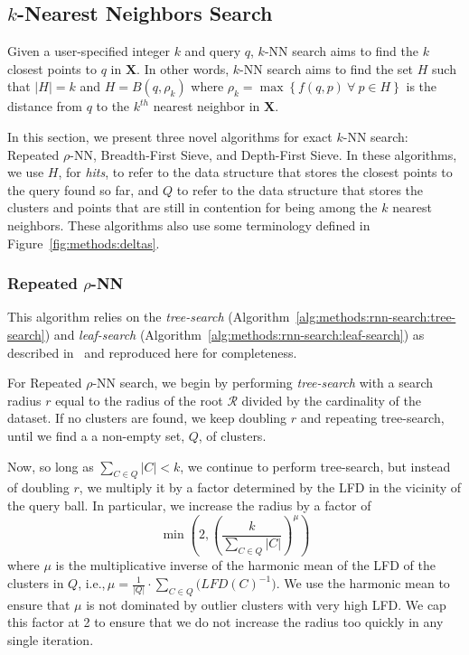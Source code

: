\subsection{\texorpdfstring{$k$}{k}-Nearest Neighbors Search}
\label{sec:methods:knn-search}

Given a user-specified integer $k$ and query $q$, $k$-NN search aims to find the $k$ closest points to $q$ in $\textbf{X}$.
In other words, $k$-NN search aims to find the set $H$ such that $|H| = k$ and $H = B(q, \rho_k)$ where $\rho_k = \max \left\{ f(q, p) \ \forall \ p \in H \right\}$ is the distance from $q$ to the $k^{th}$ nearest neighbor in $\textbf{X}$.

In this section, we present three novel algorithms for exact $k$-NN search:
Repeated $\rho$-NN, Breadth-First Sieve, and Depth-First Sieve.
In these algorithms, we use $H$, for \textit{hits}, to refer to the data structure that stores the closest points to the query found so far, and $Q$ to refer to the data structure that stores the clusters and points that are still in contention for being among the $k$ nearest neighbors.
These algorithms also use some terminology defined in Figure~\ref{fig:methods:deltas}.


\subsubsection{Repeated \texorpdfstring{$\rho$}{p}-NN}
\label{sec:methods:knn-search:repeated-rnn}

This algorithm relies on the \textit{tree-search} (Algorithm~\ref{alg:methods:rnn-search:tree-search}) and \textit{leaf-search} (Algorithm~\ref{alg:methods:rnn-search:leaf-search}) as described in~\cite{ishaq2019clustered} and reproduced here for completeness.

For Repeated $\rho$-NN search, we begin by performing \textit{tree-search} with a search radius $r$ equal to the radius of the root $\mathcal{R}$ divided by the cardinality of the dataset.
If no clusters are found, we keep doubling $r$ and repeating tree-search, until we find a a non-empty set, $Q$, of clusters.

Now, so long as $\sum_{C \in Q} |C| < k$, we continue to perform tree-search, but instead of doubling $r$, we multiply it by a factor determined by the LFD in the vicinity of the query ball.
In particular, we increase the radius by a factor of
\begin{equation}
    \min \left(2, \left( {\frac{k}{\sum_{C \in Q} |C|}} \right)^{\mu} \right)
    \label{eq:methods:repeated-rnn-factor}
\end{equation}
where $\mu$ is the multiplicative inverse of the harmonic mean of the LFD of the clusters in $Q$, i.e.,\,$\mu = \frac{1}{|Q|} \cdot \sum_{C \in Q} \big( LFD(C)^{-1} \big)$.
We use the harmonic mean to ensure that $\mu$ is not dominated by outlier clusters with very high LFD.
We cap this factor at 2 to ensure that we do not increase the radius too quickly in any single iteration.

